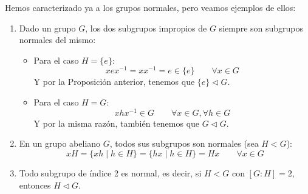\begin{ejemplo}
    Hemos caracterizado ya a los grupos normales, pero veamos ejemplos de ellos:
    \begin{enumerate}
        \item Dado un grupo $G$, los dos subgrupos impropios de $G$ siempre son subgrupos normales del mismo:
            \begin{itemize}
                \item Para el caso $H=\{e\}$:
                    \begin{equation*}
                        xex^{-1} = xx^{-1} = e \in \{e\} \qquad \forall x\in G
                    \end{equation*}
                    Y por la Proposición anterior, tenemos que $\{e\}\lhd G$.
                \item Para el caso $H=G$:
                    \begin{equation*}
                        xhx^{-1} \in G \qquad \forall x\in G, \forall h\in G
                    \end{equation*}
                    Y por la misma razón, también tenemos que $G\lhd G$.
            \end{itemize}
        \item En un grupo abeliano $G$, todos sus subgrupos son normales (sea $H<G$):
            \begin{equation*}
                xH = \{xh \mid h \in H\} = \{hx \mid h \in H\} = Hx \qquad \forall x\in G
            \end{equation*}
        \item Todo subgrupo de índice 2 es normal, es decir, si $H<G$ con $[G:H] = 2$, entonces $H\lhd G$.


\end{enumerate}
\end{ejemplo}
